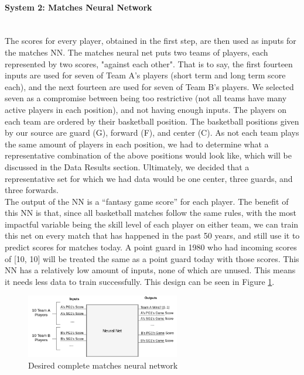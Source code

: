 \paragraph{System 2: Matches Neural Network}\mbox{}\\
The scores for every player, obtained in the first step, are then used as inputs for the matches NN. The matches neural net puts two teams of players, each represented by two scores, "against each other". That is to say, the first fourteen inputs are used for seven of Team A's players (short term and long term score each), and the next fourteen are used for seven of Team B's players. We selected seven as a compromise between being too restrictive (not all teams have many active players in each position), and not having enough inputs. The players on each team are ordered by their basketball position. The basketball positions given by our source are guard (G), forward (F), and center (C). As not each team plays the same amount of players in each position, we had to determine what a representative combination of the above positions would look like, which will be discussed in the Data Results section. Ultimately, we decided that a representative set for which we had data would be one center, three guards, and three forwards.\\
The output of the NN is a ``fantasy game score'' for each player. The benefit of this NN is that, since all basketball matches follow the same rules, with the most impactful variable being the skill level of each player on either team, we can train this net on every match that has happened in the past 50 years, and still use it to predict scores for matches today. A point guard in 1980 who had incoming scores of [10, 10] will be treated the same as a point guard today with those scores. This NN has a relatively low amount of inputs, none of which are unused. This means it needs less data to train successfully. This design can be seen in Figure \ref{fig:neural_network_full}.

\begin{figure}[ht]
    \centering
    \includegraphics[width=0.6\textwidth]{figures/neural_network_full}
    \caption{Desired complete matches neural network}
    \label{fig:neural_network_full}
\end{figure}

